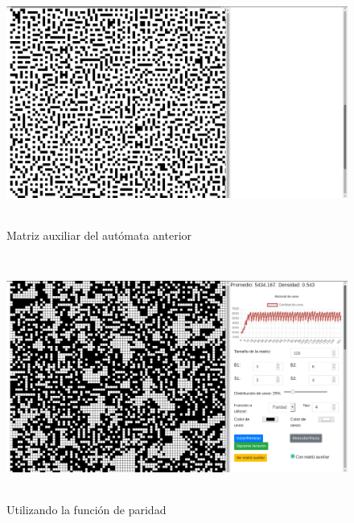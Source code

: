 \documentclass[12pt, titlepage]{article}
\begin{document}
\begin{figure}[H]
\begin{center}
 \includegraphics[width=15cm, height=8cm]{./img/3634-min-aux.png}
 \caption{Matriz auxiliar del autómata anterior}
 \label{fig:3634-min-aux}
\end{center}
\end{figure}

\begin{figure}[H]
\begin{center}
 \includegraphics[width=15cm, height=8cm]{./img/3634-paridad.png}
 \caption{Utilizando la función de paridad}
 \label{fig:3634-paridad}
\end{center}
\end{figure}
\end{document}
